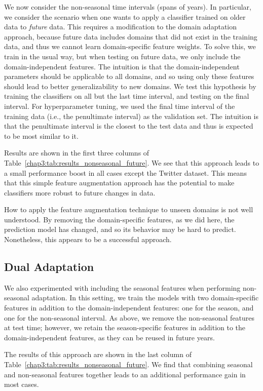 We now consider the non-seasonal time intervals (spans of years). 
In particular, we consider the scenario when one wants to apply a classifier trained on older data to {\em future} data.
This requires a modification to the domain adaptation approach, because future data includes domains that did not exist in the training data, and thus we cannot learn domain-specific feature weights.
To solve this, we train in the usual way, but when testing on future data, we only include the domain-independent features.
The intuition is that the domain-independent parameters should be applicable to all domains, and so using only these features should lead to better generalizability to new domains.
We test this hypothesis by training the classifiers on all but the last time interval, and testing on the final interval.
For hyperparameter tuning, we used the final time interval of the training data (i.e., the penultimate interval) as the validation set. The intuition is that the penultimate interval is the closest to the test data and thus is expected to be most similar to it.

Results are shown in the first three columns of Table~\ref{chap3:tab:results_nonseasonal_future}.
We see that this approach leads to a small performance boost in all cases except the Twitter dataset. 
This means that this simple feature augmentation approach has the potential to make classifiers more robust to future changes in data.

How to apply the feature augmentation technique to unseen domains is not well understood.
By removing the domain-specific features, as we did here, the prediction model has changed, and so its behavior may be hard to predict.
Nonetheless, this appears to be a successful approach.

\subsection{Dual Adaptation}
We also experimented with including the seasonal features when performing non-seasonal adaptation.
In this setting, we train the models with two domain-specific features in addition to the domain-independent features: one for the season, and one for the non-seasonal interval. 
As above, we remove the non-seasonal features at test time; however, we retain the season-specific features in addition to the domain-independent features, as they can be reused in future years.

The results of this approach are shown in the last column of Table~\ref{chap3:tab:results_nonseasonal_future}.
We find that combining seasonal and non-seasonal features together leads to an additional performance gain in most cases.


